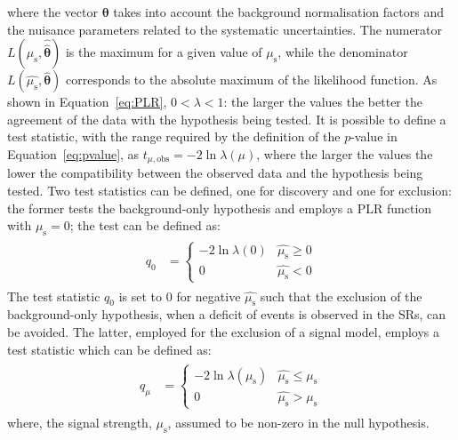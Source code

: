 			\noindent where the vector $\bm{\theta}$ takes into account the background normalisation factors and the nuisance parameters related to the systematic uncertainties. The numerator $L\left ( \mu_{\mathrm{s}}, \hat{\hat{\bm{\theta}}} \right )$ is the maximum for a given value of $\mu_{\mathrm{s}}$, while the denominator $L\left ( \hat{\mu_{\mathrm{s}}}, \hat{\bm{\theta}} \right )$ corresponds to the absolute maximum of the likelihood function. As shown in Equation~\ref{eq:PLR}, $0 < \lambda < 1$: the larger the values the better the agreement of the data with the hypothesis being tested. It is possible to define a test statistic, with the range required by the definition of the $p$-value in Equation~\ref{eq:pvalue}, as $t_{\mu,\mathrm{obs}} = -2 \ln \lambda \left ( \mu \right )$, where the larger the values the lower the compatibility between the observed data and the hypothesis being tested. Two test statistics can be defined, one for discovery and one for exclusion: the former tests the background-only hypothesis and employs a \ac{PLR} function with $\mu_{\mathrm{s}} = 0$; the test can be defined as:
			\begin{align}
			\label{eq:test_discovery}
				\begin{split}
					q_0 & = 
					\begin{cases}
						-2 \ln \lambda \left( 0 \right ) & \hat{\mu_{\mathrm{s}}} \geq 0 \\
						0   & \hat{\mu_{\mathrm{s}}} < 0
					\end{cases}
				\end{split}
			\end{align}
			\noindent The test statistic $q_0$ is set to $0$ for negative $\hat{\mu_{\mathrm{s}}}$ such that the exclusion of the background-only hypothesis, when a deficit of events is observed in the \acp{SR}, can be avoided. The latter, employed for the exclusion of a signal model, employs a test statistic which can be defined as:
			\begin{align}
			\label{eq:test_exclusion}
				\begin{split}
					q_{\mu} & = 
					\begin{cases}
						-2 \ln \lambda \left( \mu_{\mathrm{s}} \right ) & \hat{\mu_{\mathrm{s}}} \leq \mu_{\mathrm{s}} \\
						0   & \hat{\mu_{\mathrm{s}}} > \mu_{\mathrm{s}}
					\end{cases}
				\end{split}
			\end{align}
			\noindent where, the signal strength, $\mu_{\mathrm{s}}$, assumed to be non-zero in the null hypothesis.  

